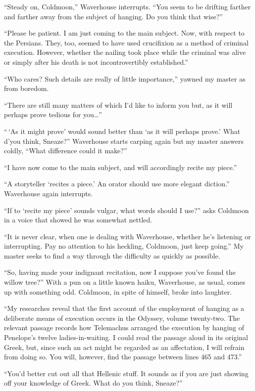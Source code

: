 \documentclass{book}
\begin{document}
``Steady on, Coldmoon,'' Waverhouse interrupts. ``You seem to be
drifting farther and farther away from the subject of hanging. Do you
think that wise?''

``Please be patient. I am just coming to the main subject. Now, with
respect to the Persians. They, too, seemed to have used crucifixion as a
method of criminal execution. However, whether the nailing took place
while the criminal was alive or simply after his death is not
incontrovertibly established.''

``Who cares? Such details are really of little importance,'' yawned my
master as from boredom.

``There are still many matters of which I'd like to inform you but, as
it will perhaps prove tedious for you\ldots{}''

``\,`As it might prove' would sound better than `as it will perhaps
prove.' What d'you think, Sneaze?'' Waverhouse starts carping again but
my master answers coldly, ``What difference could it make?''

``I have now come to the main subject, and will accordingly recite my
piece.''

``A storyteller `recites a piece.' An orator should use more elegant
diction.'' Waverhouse again interrupts.

``If to `recite my piece' sounds vulgar, what words should I use?'' asks
Coldmoon in a voice that showed he was somewhat nettled.

``It is never clear, when one is dealing with Waverhouse, whether he's
listening or interrupting. Pay no attention to his heckling, Coldmoon,
just keep going.'' My master seeks to find a way through the difficulty
as quickly as possible.

``So, having made your indignant recitation, now I suppose you've found
the willow tree?'' With a pun on a little known haiku, Waverhouse, as
usual, comes up with something odd. Coldmoon, in spite of himself, broke
into laughter.

``My researches reveal that the first account of the employment of
hanging as a deliberate means of execution occurs in the Odyssey, volume
twenty-two. The relevant passage records how Telemachus arranged the
execution by hanging of Penelope's twelve ladies-in-waiting. I could
read the passage aloud in its original Greek, but, since such an act
might be regarded as an affectation, I will refrain from doing so. You
will, however, find the passage between lines 465 and 473.''

``You'd better cut out all that Hellenic stuff. It sounds as if you are
just showing off your knowledge of Greek. What do you think, Sneaze?''
\end{document}
